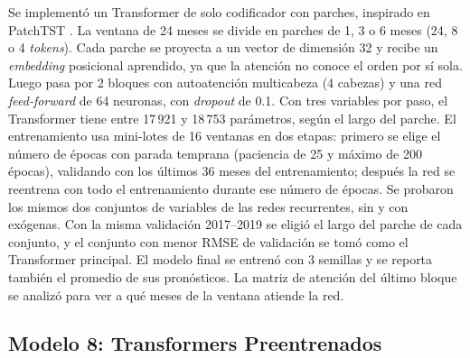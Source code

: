 \documentclass[conference]{IEEEtran}
\begin{document}
Se implementó un Transformer de solo codificador \cite{vaswani2017} con parches, inspirado en PatchTST \cite{nie2023}. La ventana de 24 meses se divide en parches de 1, 3 o 6 meses (24, 8 o 4 \textit{tokens}). Cada parche se proyecta a un vector de dimensión 32 y recibe un \textit{embedding} posicional aprendido, ya que la atención no conoce el orden por sí sola. Luego pasa por 2 bloques con autoatención multicabeza (4 cabezas) y una red \textit{feed-forward} de 64 neuronas, con \textit{dropout} de 0.1. Con tres variables por paso, el Transformer tiene entre 17\,921 y 18\,753 parámetros, según el largo del parche. El entrenamiento usa mini-lotes de 16 ventanas en dos etapas: primero se elige el número de épocas con parada temprana (paciencia de 25 y máximo de 200 épocas), validando con los últimos 36 meses del entrenamiento; después la red se reentrena con todo el entrenamiento durante ese número de épocas. Se probaron los mismos dos conjuntos de variables de las redes recurrentes, sin y con exógenas. Con la misma validación 2017--2019 se eligió el largo del parche de cada conjunto, y el conjunto con menor RMSE de validación se tomó como el Transformer principal. El modelo final se entrenó con 3 semillas y se reporta también el promedio de sus pronósticos. La matriz de atención del último bloque se analizó para ver a qué meses de la ventana atiende la red.

\subsection{Modelo 8: Transformers Preentrenados}
\end{document}
